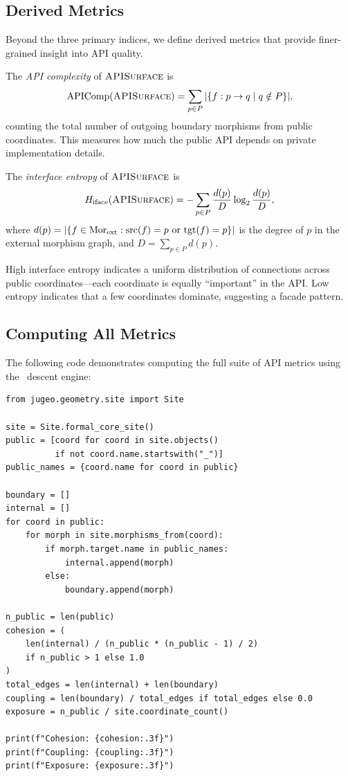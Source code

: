 \documentclass[11pt]{article}
\newcommand{\APISurface}{\textsc{APISurface}}
\begin{document}
\subsection{Derived Metrics}\label{sec:derived-metrics}

Beyond the three primary indices, we define derived metrics that provide
finer-grained insight into API quality.

\begin{definition}\label{def:api-complex}
The \emph{API complexity} of $\APISurface$ is
\[
  \mathrm{APIComp}(\APISurface) = \sum_{p \in P} |\{f : p \to q \mid q \notin P\}|,
\]
counting the total number of outgoing boundary morphisms from public
coordinates.  This measures how much the public API depends on private
implementation details.
\end{definition}

\begin{definition}\label{def:iface-entropy}
The \emph{interface entropy} of $\APISurface$ is
\[
  H_{\mathrm{iface}}(\APISurface) = -\sum_{p \in P} \frac{d(p)}{D}
  \log_2 \frac{d(p)}{D},
\]
where $d(p) = |\{f \in \mathrm{Mor}_{\mathrm{ext}} : \mathrm{src}(f) = p \text{ or }
\mathrm{tgt}(f) = p\}|$ is the degree of $p$ in the external morphism
graph, and $D = \sum_{p \in P} d(p)$.
\end{definition}

High interface entropy indicates a uniform distribution of connections
across public coordinates---each coordinate is equally ``important'' in the
API.  Low entropy indicates that a few coordinates dominate, suggesting a
facade pattern.

\subsection{Computing All Metrics}

The following code demonstrates computing the full suite of API metrics
using the \JuGeo\ descent engine:

\begin{lstlisting}[style=jugeo-python]
from jugeo.geometry.site import Site

site = Site.formal_core_site()
public = [coord for coord in site.objects()
          if not coord.name.startswith("_")]
public_names = {coord.name for coord in public}

boundary = []
internal = []
for coord in public:
    for morph in site.morphisms_from(coord):
        if morph.target.name in public_names:
            internal.append(morph)
        else:
            boundary.append(morph)

n_public = len(public)
cohesion = (
    len(internal) / (n_public * (n_public - 1) / 2)
    if n_public > 1 else 1.0
)
total_edges = len(internal) + len(boundary)
coupling = len(boundary) / total_edges if total_edges else 0.0
exposure = n_public / site.coordinate_count()

print(f"Cohesion: {cohesion:.3f}")
print(f"Coupling: {coupling:.3f}")
print(f"Exposure: {exposure:.3f}")
\end{lstlisting}
\end{document}
